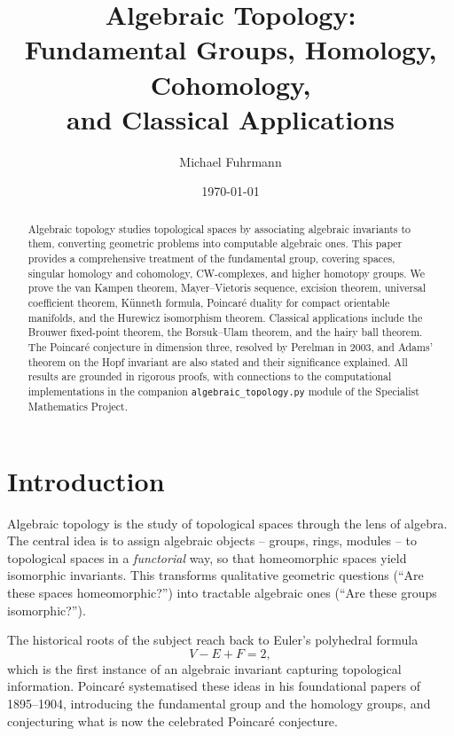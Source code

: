 \documentclass[12pt,a4paper]{amsart}
\author{Michael Fuhrmann}
\date{\today}
\theoremstyle{definition}
\begin{document}
\title{Algebraic Topology:\\
Fundamental Groups, Homology, Cohomology,\\
and Classical Applications}

\begin{abstract}
Algebraic topology studies topological spaces by associating algebraic invariants
to them, converting geometric problems into computable algebraic ones. This paper
provides a comprehensive treatment of the fundamental group, covering spaces,
singular homology and cohomology, CW-complexes, and higher homotopy groups.
We prove the van Kampen theorem, Mayer--Vietoris sequence, excision theorem,
universal coefficient theorem, K\"unneth formula, Poincar\'e duality for compact
orientable manifolds, and the Hurewicz isomorphism theorem. Classical applications
include the Brouwer fixed-point theorem, the Borsuk--Ulam theorem, and the
hairy ball theorem. The Poincar\'e conjecture in dimension three, resolved by
Perelman in 2003, and Adams' theorem on the Hopf invariant are also stated and
their significance explained. All results are grounded in rigorous proofs, with
connections to the computational implementations in the companion
\texttt{algebraic\_topology.py} module of the Specialist Mathematics Project.
\end{abstract}

\maketitle
\tableofcontents

\section{Introduction}

Algebraic topology is the study of topological spaces through the lens of algebra.
The central idea is to assign algebraic objects -- groups, rings, modules -- to
topological spaces in a \emph{functorial} way, so that homeomorphic spaces yield
isomorphic invariants. This transforms qualitative geometric questions (``Are these
spaces homeomorphic?'') into tractable algebraic ones (``Are these groups isomorphic?'').

The historical roots of the subject reach back to Euler's polyhedral formula
\[
  V - E + F = 2,
\]
which is the first instance of an algebraic invariant capturing topological
information. Poincar\'e systematised these ideas in his foundational papers of
1895--1904, introducing the fundamental group and the homology groups, and
conjecturing what is now the celebrated Poincar\'e conjecture.
\end{document}
